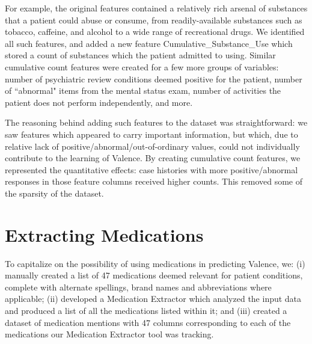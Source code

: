  For example, the original features contained a relatively rich arsenal of 
 substances that a patient could abuse or consume, from readily-available substances such as tobacco, caffeine, and alcohol to a wide range of recreational drugs. We identified all such features, and added a new feature
 \textsf{Cumulative\_Substance\_Use} which stored a count of substances which the patient
 admitted to using.  Similar cumulative count features were created for a few more 
 groups of variables: number of psychiatric review conditions deemed positive for the patient, number of ``abnormal" items from the mental status exam, number of activities
 the patient does not perform independently, and more.
 
 The reasoning behind adding such features to the dataset was straightforward: we saw features which appeared to carry important information, but which, due to relative lack of positive/abnormal/out-of-ordinary values, could not individually contribute to the learning of \textsf{Valence}. By creating cumulative count features, we represented the quantitative effects: case histories with more positive/abnormal responses in those feature columns received higher counts. This removed some of the sparsity of the dataset. 
 
 
 
 \section{Extracting Medications}  
 To capitalize on the possibility of using medications in predicting \textsf{Valence},
 we: (i)  manually created a list of 47 medications deemed relevant for
     patient conditions, complete with alternate spellings, brand names and abbreviations where applicable; (ii) developed a \textsf{Medication Extractor} which analyzed the input data and produced a list of all the medications listed within it; and (iii)
     created a dataset of medication mentions with 47 columns corresponding to each of the medications our \textsf{Medication Extractor} tool was tracking.     

